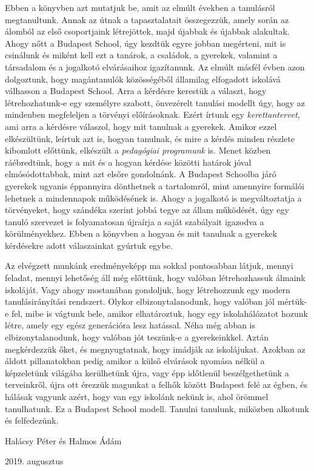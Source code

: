 Ebben a könyvben azt mutatjuk be, amit az elmúlt években a tanulásról megtanultunk. Annak az útnak a tapasztalatait összegezzük, amely során az álomból az első csoportjaink létrejöttek, majd újabbak és újabbak alakultak. Ahogy nőtt a Budapest School, úgy kezdtük egyre jobban megérteni, mit is csinálunk és miként kell ezt a tanárok, a családok, a gyerekek, valamint a társadalom és a jogalkotó elvárásaihoz igazítanunk. Az elmúlt másfél évben azon dolgoztunk, hogy magántanulók közösségéből államilag elfogadott iskolává válhasson a Budapest School. Arra a kérdésre kerestük a választ, hogy létrehozhatunk-e  egy személyre szabott, önvezérelt tanulási modellt úgy, hogy az mindenben megfeleljen a törvényi előírásoknak. Ezért írtunk egy \emph{kerettantervet}, ami arra a kérdésre válaszol, hogy mit tanulnak a gyerekek. Amikor ezzel elkészültünk, leírtuk azt is, hogyan tanulnak, és mire a kérdés minden részlete kibomlott előttünk, elkészült a \emph{pedagógiai programunk} is. Menet közben ráébredtünk, hogy a mit és a hogyan kérdése közötti határok jóval elmósódottabbak, mint azt elsőre gondolnánk. A Budapest Schoolba járó gyerekek ugyanis éppannyira dönthetnek a tartalomról, mint amennyire formálói lehetnek a mindennapok működésének is. Ahogy a jogalkotó is megváltoztatja a törvényeket, hogy szándéka szerint jobbá tegye az állam működését, úgy egy tanuló szervezet is folyamatosan újraírja a saját szabályait igazodva a körülményekhez. Ebben a könyvben a hogyan és mit tanulnak a gyerekek kérdésekre adott válaszainkat gyúrtuk egybe.

Az elvégzett munkánk eredményeképp ma sokkal pontosabban látjuk, mennyi feladat, mennyi lehetőség áll még előttünk, hogy valóban létrehozhassuk álmaink iskoláját. Vagy ahogy mostanában gondoljuk, hogy létrehozzunk egy modern tanulásirányítási rendszert. Olykor elbizonytalanodunk, hogy valóban jól mértük-e fel, mibe is vágtunk bele, amikor elhatároztuk, hogy egy iskolahálózatot hozunk létre, amely egy egész generációra lesz hatással. Néha még abban is elbizonytalanodunk, hogy valóban jót teszünk-e a gyerekeinkkel. Aztán megkérdezzük őket, és megnyugtatnak, hogy imádják az iskolájukat. Azokban az áldott pillanatokban pedig amikor a külső elvárások nyomása nélkül a képzeletünk világába kerülhetünk újra, vagy épp időtlenül beszélgethetünk a terveinkről, újra ott érezzük magunkat a felhők között Budapest felé az égben, és hálásak vagyunk azért, hogy van egy iskolánk nekünk is, ahol örömmel tanulhatunk. Ez a Budapest School modell. Tanulni tanulunk, miközben alkotunk és felfedezünk. 

\bigskip
{
\raggedright Halácsy Péter és Halmos Ádám\\
\raggedright 2019. augusztus
}